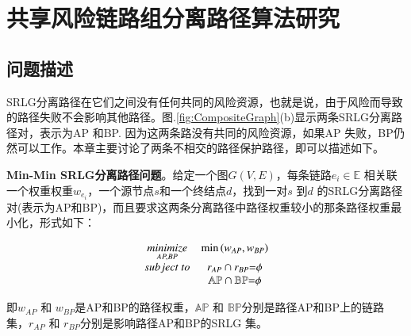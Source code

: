 \chapter{共享风险链路组分离路径算法研究}

\section{问题描述}
SRLG分离路径在它们之间没有任何共同的风险资源，也就是说，由于风险而导致的路径失败不会影响其他路径。图.\ref{fig:CompositeGraph}(b)显示两条SRLG分离路径对，表示为AP 和BP. 因为这两条路没有共同的风险资源，如果AP 失败，BP仍然可以工作。本章主要讨论了两条不相交的路径保护路径，即可以描述如下。

\textbf{Min-Min SRLG分离路径问题}。给定一个图$G(V,E)$，每条链路$e_i\in \mathbb{E}$ 相关联一个权重权重$w_{e_i}$，一个源节点$s$和一个终结点$d$，找到一对$s$ 到$d$ 的SRLG分离路径对(表示为AP和BP)，而且要求这两条分离路径中路径权重较小的那条路径权重最小化，形式如下：

\begin{equation}
\begin{array}{*{20}{c}}
   {\mathop {minimize}\limits_{AP,BP} } & {\min \left( {{w_{AP}},{w_{BP}}} \right)}  \\
   {subject\ to} & {{r_{AP}} \cap {r_{BP}}{\rm{ = }}\phi }  \\
   {} & {\mathbb{AP} \cap \mathbb{BP}{\rm{ = }}\phi }  \\
\end{array}
\label{eq:problem definition}
\end{equation}

即${w_{AP}}$ 和 ${w_{BP}}$是AP和BP的路径权重，$\mathbb{AP}$ 和 $\mathbb{BP}$分别是路径AP和BP上的链路集，${r_{AP}}$ 和 ${r_{BP}}$分别是影响路径AP和BP的SRLG 集。


